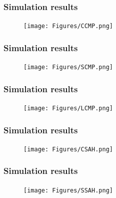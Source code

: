 \begin{frame}
	\frametitle{Simulation results} \footnotesize
	\begin{center}
		\begin{figure}
			\texttt{[image: Figures/CCMP.png]}\\
		\end{figure}
		\scriptsize{ \color{blue}{}}
	\end{center}
\end{frame}
\begin{frame}
	\frametitle{Simulation results} \footnotesize
	\begin{center}
		\begin{figure}
			\texttt{[image: Figures/SCMP.png]}\\
		\end{figure}
		\scriptsize{ \color{blue}{}}
	\end{center}
\end{frame}
\begin{frame}
	\frametitle{Simulation results} \footnotesize
	\begin{center}
		\begin{figure}
			\texttt{[image: Figures/LCMP.png]}\\
		\end{figure}
		\scriptsize{ \color{blue}{}}
	\end{center}
\end{frame}
\begin{frame}
	\frametitle{Simulation results} \footnotesize
	\begin{center}
		\begin{figure}
			\texttt{[image: Figures/CSAH.png]}\\
		\end{figure}
		\scriptsize{ \color{blue}{}}
	\end{center}
\end{frame}
\begin{frame}
	\frametitle{Simulation results} \footnotesize
	\begin{center}
		\begin{figure}
			\texttt{[image: Figures/SSAH.png]}\\
		\end{figure}
		\scriptsize{ \color{blue}{}}
	\end{center}
\end{frame}
